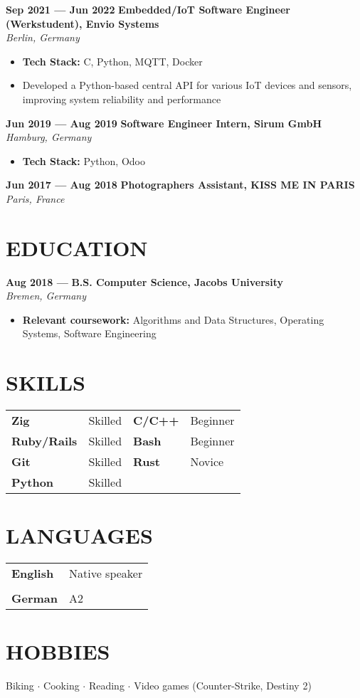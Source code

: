 \documentclass[11pt,a4paper]{article}
\newcommand{\resumesection}[1]{
  \section*{\textcolor{sectioncolor}{\MakeUppercase{#1}}}
}
\newcommand{\skill}[2]{
  \textbf{#1} & #2 \\
}
\newcommand{\job}[4]{
  \textbf{#1 — #2} \hfill \textbf{#3} \\
  \textit{#4}
}
\begin{document}
\job{Sep 2021} {Jun 2022} {Embedded/IoT Software Engineer (Werkstudent), Envio Systems} {Berlin, Germany}
\begin{itemize}[leftmargin=*,label=$\bullet$,itemsep=0.3ex]
    \item \textbf{Tech Stack:} C, Python, MQTT, Docker
    \item Developed a Python-based central API for various IoT devices and sensors, improving system reliability and performance
\end{itemize}

\job{Jun 2019} {Aug 2019} {Software Engineer Intern, Sirum GmbH} {Hamburg, Germany}
\begin{itemize}[leftmargin=*,label=$\bullet$,itemsep=0.3ex]
    \item \textbf{Tech Stack:} Python, Odoo
\end{itemize}

\job{Jun 2017} {Aug 2018} {Photographers Assistant, KISS ME IN PARIS} {Paris, France}

\resumesection{Education}
\job{Aug 2018} {} {B.S. Computer Science, Jacobs University} {Bremen, Germany}
\begin{itemize}[leftmargin=*,itemsep=0.3ex]
  \item \textbf{Relevant coursework:} Algorithms and Data Structures, Operating Systems, Software Engineering
\end{itemize}

\resumesection{Skills}
\begin{tabular}{p{}p{}p{}p{}}
  \textbf{Zig} & Skilled & \textbf{C/C++} & Beginner \\
  \textbf{Ruby/Rails} & Skilled & \textbf{Bash} & Beginner \\
  \textbf{Git} & Skilled & \textbf{Rust} & Novice \\
  \textbf{Python} & Skilled & \\
\end{tabular}

\resumesection{Languages}
\begin{tabular}{ll}
  \skill{English} {Native speaker} \\
  \skill{German} {A2}
\end{tabular}

\resumesection{Hobbies}
Biking $\cdot$
Cooking $\cdot$
Reading $\cdot$
Video games (Counter-Strike, Destiny 2)
\end{document}
